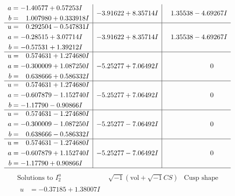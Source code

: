 \documentclass[1p]{elsarticle_modified}
\theoremstyle{definition}
\newcommand{\I}{\sqrt{-1}}
\begin{document}
$$\begin{array}{c|c|c}
\begin{aligned}
a &= -1.40577 + 0.57253 I \\
b &= \phantom{-}1.007980 + 0.333918 I\end{aligned}
 & -3.91622 + 8.35714 I & \phantom{-}1.35538 - 4.69267 I \\ \hline\begin{aligned}
u &= \phantom{-}0.292504 - 0.547831 I \\
a &= -0.28515 + 3.07714 I \\
b &= -0.57531 + 1.39212 I\end{aligned}
 & -3.91622 + 8.35714 I & \phantom{-}1.35538 - 4.69267 I \\ \hline\begin{aligned}
u &= \phantom{-}0.574631 + 1.274680 I \\
a &= -0.300009 + 1.087250 I \\
b &= \phantom{-}0.638666 + 0.586332 I\end{aligned}
 & -5.25277 + 7.06492 I & \phantom{-0.000000 } 0 \\ \hline\begin{aligned}
u &= \phantom{-}0.574631 + 1.274680 I \\
a &= -0.607879 - 1.152740 I \\
b &= -1.17790 - 0.90866 I\end{aligned}
 & -5.25277 + 7.06492 I & \phantom{-0.000000 } 0 \\ \hline\begin{aligned}
u &= \phantom{-}0.574631 - 1.274680 I \\
a &= -0.300009 - 1.087250 I \\
b &= \phantom{-}0.638666 - 0.586332 I\end{aligned}
 & -5.25277 - 7.06492 I & \phantom{-0.000000 } 0 \\ \hline\begin{aligned}
u &= \phantom{-}0.574631 - 1.274680 I \\
a &= -0.607879 + 1.152740 I \\
b &= -1.17790 + 0.90866 I\end{aligned}
 & -5.25277 - 7.06492 I & \phantom{-0.000000 } 0\\
 \hline 
 \end{array}$$\newpage$$\begin{array}{c|c|c}  
\text{Solutions to }I^u_{2}& \I (\text{vol} + \sqrt{-1}CS) & \text{Cusp shape}\\
 \hline 
\begin{aligned}
u &= -0.37185 + 1.38007 I \\

\end{aligned}
\end{array}$$
\end{document}
